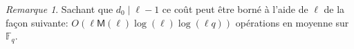 \documentclass[10pt,a4paper]{book}
\theoremstyle{plain}
\theoremstyle{definition}
\theoremstyle{definition}
\theoremstyle{definition}
\theoremstyle{definition}
\theoremstyle{remark}
\newtheorem{rem}[thm]{Remarque}
\theoremstyle{remark}
\begin{document}
 
\begin{rem}
Sachant que $d_0 \mid \ell-1$ ce coût peut être borné à l'aide de $\ell$ de la façon suivante: $O(\ell\mathsf{M}(\ell)\log(\ell)\log(\ell q))$ opérations en moyenne sur $\mathbb{F}_q$.
\end{rem}
 
\end{document}
